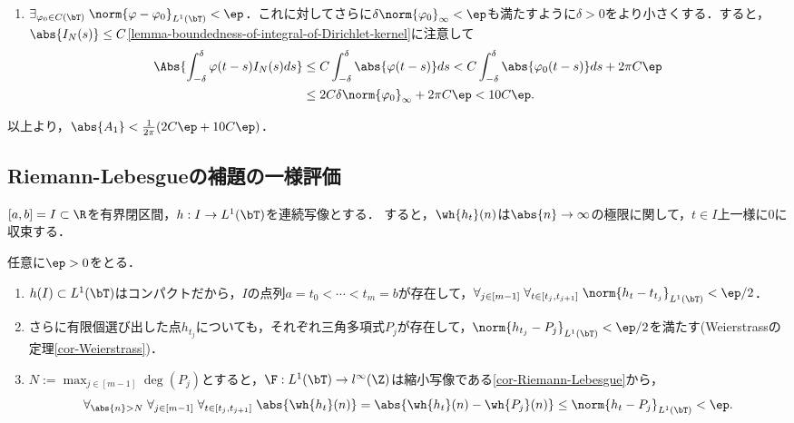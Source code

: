 \documentclass[uplatex,dvipdfmx]{jsreport}
\begin{document}
\begin{Proof}
\begin{description}
\begin{enumerate}
            \item $\exists_{\varphi_0\in C(\bT)}\;\norm{\varphi-\varphi_0}_{L^1(\bT)}<\ep$．これに対してさらに$\delta\norm{\varphi_0}_\infty<\ep$も満たすように$\delta>0$をより小さくする．すると，$\abs{I_N(s)}\le C$\ref{lemma-boundedness-of-integral-of-Dirichlet-kernel}に注意して
            \begin{align*}
                \Abs{\int^\delta_{-\delta}\varphi(t-s)I_N(s)ds}&\le C\int^\delta_{-\delta}\abs{\varphi(t-s)}ds<C\int^\delta_{-\delta}\abs{\varphi_0(t-s)}ds+2\pi C\ep\\
                &\le 2C\delta\norm{\varphi_0}_\infty+2\pi C\ep<10C\ep.
            \end{align*}
        \end{enumerate}
        以上より，$\abs{A_1}<\frac{1}{2\pi}(2C\ep+10C\ep)$．
    \end{description}
\end{Proof}

\subsection{Riemann-Lebesgueの補題の一様評価}

\begin{lemma}\label{lemma-uniform-Riemann-Lebesgue}
    $[a,b]=I\subset\R$を有界閉区間，$h:I\to L^1(\bT)$を連続写像とする．
    すると，$\wh{h_t}(n)$は$\abs{n}\to\infty$の極限に関して，$t\in I$上一様に$0$に収束する．
\end{lemma}
\begin{Proof}
    任意に$\ep>0$をとる．
    \begin{enumerate}
        \item $h(I)\subset L^1(\bT)$はコンパクトだから，$I$の点列$a=t_0<\cdots<t_m=b$が存在して，$\forall_{j\in[m-1]}\;\forall_{t\in[t_j,t_{j+1}]}\;\norm{h_t-t_{t_j}}_{L^1(\bT)}<\ep/2$．
        \item さらに有限個選び出した点$h_{t_j}$についても，それぞれ三角多項式$P_j$が存在して，$\norm{h_{t_j}-P_j}_{L^1(\bT)}<\ep/2$を満たす(Weierstrassの定理\ref{cor-Weierstrass})．
        \item $N:=\max_{j\in[m-1]}\deg(P_j)$とすると，$\F:L^1(\bT)\to l^\infty(\Z)$は縮小写像である\ref{cor-Riemann-Lebesgue}から，
        \[\forall_{\abs{n}>N}\;\forall_{j\in[m-1]}\;\forall_{t\in[t_j,t_{j+1}]}\;\abs{\wh{h_t}(n)}=\abs{\wh{h_t}(n)-\wh{P_j}(n)}\le\norm{h_t-P_j}_{L^1(\bT)}<\ep.\]
    \end{enumerate}
\end{Proof}
\end{document}
